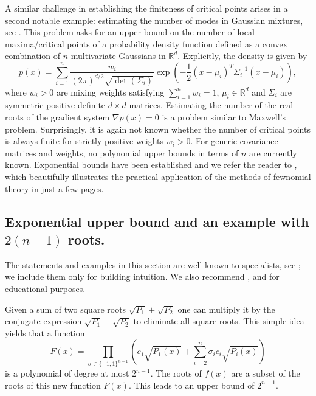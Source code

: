 \documentclass{article}
\begin{document}
A similar challenge in establishing the finiteness of critical points arises in a second notable example: estimating the number of modes in Gaussian mixtures, see \cite{AEH}. This problem asks for an upper bound on the number of local maxima/critical points of a probability density function defined as a convex combination of $n$ multivariate Gaussians in $\mathbb{R}^d$. Explicitly, the density is given by
\begin{equation*}
    p(x) = \sum_{i=1}^n \frac{w_i}{(2\pi)^{d/2} \sqrt{\det(\Sigma_i)}} \exp\left( -\frac{1}{2} (x-\mu_i)^T \Sigma_i^{-1} (x-\mu_i) \right),
\end{equation*}
where $w_i > 0$ are mixing weights satisfying $\sum_{i=1}^n w_i = 1$, $\mu_i \in \mathbb{R}^d$ and $\Sigma_i$ are symmetric positive-definite $d \times d$ matrices. Estimating the number of the real roots of the gradient system $\nabla p(x) = 0$ is a problem similar to Maxwell's problem. Surprisingly, it is again not known whether the number of critical points is always finite for strictly positive weights $w_i > 0$. For generic covariance matrices and weights, no polynomial upper bounds in terms of  $n$ are currently known. Exponential bounds have been established and we refer the reader to \cite{AEH}, which beautifully illustrates the practical application of the methods of fewnomial theory in just a few pages.









\subsection*{Exponential upper bound and an example with $2(n-1)$ roots.}
\quad 

The statements and examples in this section are well known to specialists, see \cite{ADK}; we include them only for building intuition. We also recommend \cite{A},\cite{K} and \cite{M} for educational purposes. 

Given a sum of two square roots $\sqrt{P_1}+\sqrt{P_2}$ one can multiply it by the conjugate expression  $\sqrt{P_1}- \sqrt{P_2}$ to eliminate all square roots. This simple idea yields that a function
\[
F(x) = \prod_{\sigma \in \{-1,1\}^{n-1}} \left(c_{1}\sqrt{P_{1}(x)} + \sum_{i=2}^{n}\sigma_i c_{i}\sqrt{P_{i}(x)}\right)
\]
is a polynomial of degree at most $2^{n-1}$. The roots of $f(x)$ are a subset of the roots of this new function $F(x)$. This leads to an  upper bound of $2^{n-1}$. 
\end{document}
